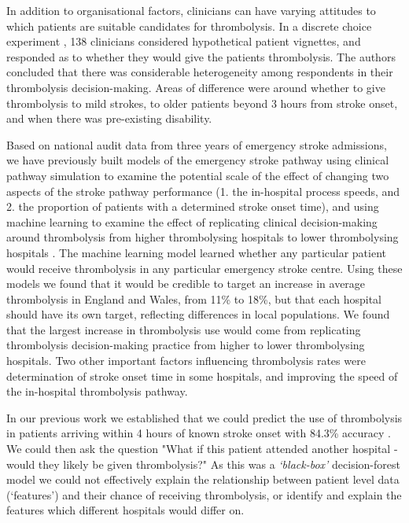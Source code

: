 In addition to organisational factors, clinicians can have varying attitudes to which patients are suitable candidates for thrombolysis. In a discrete choice experiment \cite{de_brun_factors_2018}, 138 clinicians considered hypothetical patient vignettes, and responded as to whether they would give the patients thrombolysis. The authors concluded that there was considerable heterogeneity among respondents in their thrombolysis decision-making. Areas of difference were around whether to give thrombolysis to mild strokes, to older patients beyond 3 hours from stroke onset, and when there was pre-existing disability.

Based on national audit data from three years of emergency stroke admissions, we have previously built models of the emergency stroke pathway using clinical pathway simulation to examine the potential scale of the effect of changing two aspects of the stroke pathway performance (1. the in-hospital process speeds, and 2. the proportion of patients with a determined stroke onset time), and using machine learning to examine the effect of replicating clinical decision-making around thrombolysis from higher thrombolysing hospitals to lower thrombolysing hospitals \cite{allen_using_2022, allen_use_2022}. The machine learning model learned whether any particular patient would receive thrombolysis in any particular emergency stroke centre. Using these models we found that it would be credible to target an increase in average thrombolysis in England and Wales, from 11\% to 18\%, but that each hospital should have its own target, reflecting differences in local populations. We found that the largest increase in thrombolysis use would come from replicating thrombolysis decision-making practice from higher to lower thrombolysing hospitals. Two other important factors influencing thrombolysis rates were determination of stroke onset time in some hospitals, and improving the speed of the in-hospital thrombolysis pathway.


In our previous work we established that we could predict the use of thrombolysis in patients arriving within 4 hours of known stroke onset with 84.3\% accuracy \cite{allen_use_2022}. We could then ask the question "What if this patient attended another hospital - would they likely be given thrombolysis?" As this was a \emph{`black-box'} decision-forest model we could not effectively explain the relationship between patient level data (`features') and their chance of receiving thrombolysis, or identify and explain the features which different hospitals would differ on.


